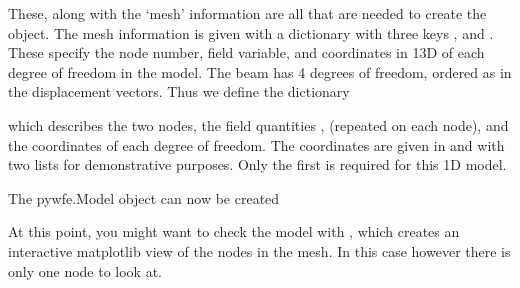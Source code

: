 \documentclass[letterpaper,10pt,english]{sphinxmanual}
\begin{document}
\sphinxAtStartPar
These, along with the ‘mesh’ information are all that are needed to create the  object. The mesh information is given with a dictionary with three keys ,  and .
These specify the node number, field variable, and coordinates in 1\sphinxhyphen{}3D of each degree of freedom in the model. The beam has 4 degrees of freedom, ordered as in the displacement vectors. Thus we define the  dictionary

\begin{sphinxVerbatim}[commandchars=\\\{\}]
   \PYG{p}{[}   \PYG{p}{]}
     \PYG{p}{[} \PYG{p}{]}
     \PYG{p}{[}
                \PYG{p}{[}   \PYG{p}{]}
                \PYG{p}{[}   \PYG{p}{]}
\PYG{p}{]}
\end{sphinxVerbatim}

\sphinxAtStartPar
which describes the two nodes, the field quantities ,  (repeated on each node), and the coordinates of each degree of freedom.
The coordinates are given in  and  with two lists for demonstrative purposes. Only the first is required for this 1D model.

\sphinxAtStartPar
The pywfe.Model object can now be created

\begin{sphinxVerbatim}[commandchars=\\\{\}]
    
\end{sphinxVerbatim}

\sphinxAtStartPar
At this point, you might want to check the model with {\hyperref[\detokenize{model:pywfe.Model.see}]{}}, which creates an interactive matplotlib view of the nodes in the mesh.
In this case however there is only one node to look at.
\end{document}
